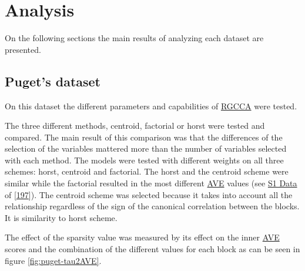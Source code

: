 \documentclass[
  12pt,
  a4paper,
  twoside,
  openright]{book}
\begin{document}
\hypertarget{analysis}{%
\section{Analysis}\label{analysis}}

On the following sections the main results of analyzing each dataset are presented.






\hypertarget{results-puget}{%
\subsection{Puget's dataset}\label{results-puget}}

On this dataset the different parameters and capabilities of \protect\hyperlink{acronyms_RGCCA}{RGCCA} were tested.

The three different methods, centroid, factorial or horst were tested and compared.
The main result of this comparison was that the differences of the selection of the variables mattered more than the number of variables selected with each method.
The models were tested with different weights on all three schemes: horst, centroid and factorial.
The horst and the centroid scheme were similar while the factorial resulted in the most different \protect\hyperlink{acronyms_AVE}{AVE} values (see \href{https://journals.plos.org/plosone/article?id=10.1371/journal.pone.0246367\#pone.0246367.s001}{S1 Data} of {[}\protect\hyperlink{ref-revilla2021}{197}{]}).
The centroid scheme was selected because it takes into account all the relationship regardless of the sign of the canonical correlation between the blocks.
It is similarity to horst scheme.

The effect of the sparsity value was measured by its effect on the inner \protect\hyperlink{acronyms_AVE}{AVE} scores and the combination of the different values for each block as can be seen in figure \ref{fig:puget-tau2AVE}.
\end{document}
